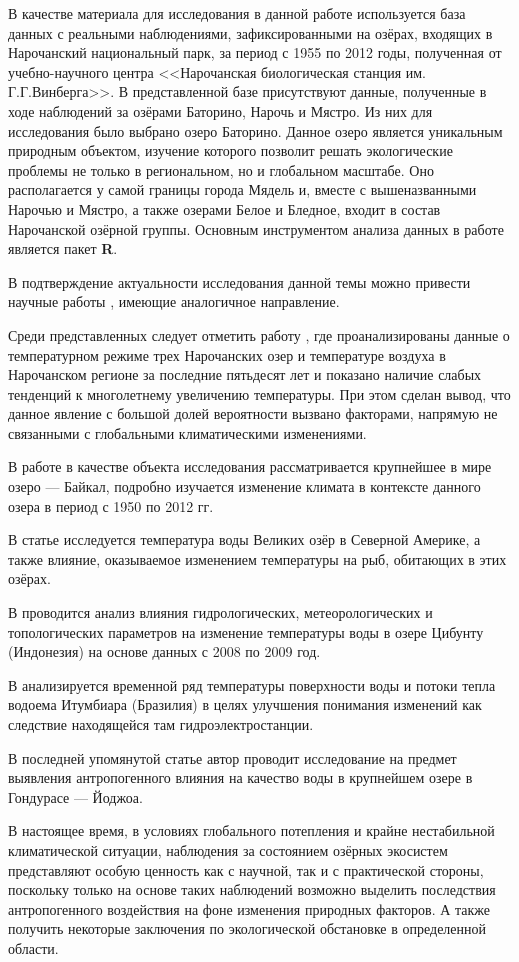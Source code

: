 В качестве материала для исследования в данной работе используется база данных с реальными наблюдениями, зафиксированными на озёрах, входящих в Нарочанский национальный парк, за период с 1955 по 2012 годы, полученная от учебно-научного центра <<Нарочанская биологическая станция им. Г.Г.Винберга>>. В представленной базе присутствуют данные, полученные в ходе наблюдений за озёрами Баторино, Нарочь и Мястро. Из них для исследования было выбрано озеро Баторино. Данное озеро является уникальным природным объектом, изучение которого позволит решать экологические проблемы не только в региональном, но и глобальном масштабе. Оно располагается у самой границы города Мядель и, вместе с вышеназванными Нарочью и Мястро, а также озерами Белое и Бледное, входит в состав Нарочанской озёрной группы. Основным инструментом анализа данных в работе является пакет \textbf{R}.

В подтверждение актуальности исследования данной темы можно привести научные работы \cite{zhukova2014, Katz2011, OBrien2012a, Subehi2011, ALCANTARA2011, Chokshi2006}, имеющие аналогичное направление.

Среди представленных следует отметить работу \cite{zhukova2014}, где проанализированы данные о температурном режиме трех Нарочанских озер и температуре воздуха в Нарочанском регионе за последние пятьдесят лет и показано наличие слабых тенденций к многолетнему увеличению температуры. При этом сделан вывод, что данное явление с большой долей вероятности вызвано факторами, напрямую не связанными с глобальными климатическими изменениями.

В работе \cite{Katz2011} в качестве объекта исследования рассматривается крупнейшее в мире озеро --- Байкал, подробно изучается изменение климата в контексте данного озера в период с 1950 по 2012 гг.

В статье \cite{OBrien2012a} исследуется температура воды Великих озёр в Северной Америке, а также влияние, оказываемое изменением температуры на рыб, обитающих в этих озёрах.

В \cite{Subehi2011} проводится анализ влияния гидрологических, метеорологических и топологических параметров на изменение температуры воды в озере Цибунту (Индонезия) на основе данных с 2008 по 2009 год.

В \cite{ALCANTARA2011} анализируется временной ряд температуры поверхности воды и потоки тепла водоема Итумбиара (Бразилия) в целях улучшения понимания изменений как следствие находящейся там гидроэлектростанции.

В последней упомянутой статье \cite{Chokshi2006} автор проводит исследование на предмет выявления антропогенного влияния на качество воды в крупнейшем озере в Гондурасе --- Йоджоа.

В настоящее время, в условиях глобального потепления и крайне нестабильной климатической ситуации, наблюдения за состоянием озёрных экосистем представляют особую ценность как с научной, так и с практической стороны, поскольку только на основе таких наблюдений возможно выделить последствия антропогенного воздействия на фоне изменения природных факторов. А также получить некоторые заключения по экологической обстановке в определенной области.